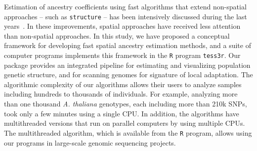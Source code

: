 Estimation of ancestry coefficients using fast algorithms that extend
non-spatial approaches -- such as {\tt structure} -- has been intensively
discussed during the last years~\citep{Wollstein2015}. In these improvements,
spatial approaches have received less attention than non-spatial approaches. In
this study, we have proposed a conceptual framework for developing fast spatial
ancestry estimation methods, and a suite of computer programs implements this
framework in the {\tt R} program {\tt tess3r}. Our package provides an
integrated pipeline for estimating and visualizing population genetic structure,
and for scanning genomes for signature of local adaptation. The algorithmic
complexity of our algorithms allows their users to analyze samples including
hundreds to thousands of individuals. For example, analyzing more than one
thousand {\it A. thaliana} genotypes, each including more than 210k SNPs, took
only a few minutes using a single CPU. In addition, the algorithms have
multithreaded versions that run on parallel computers by using multiple CPUs.
The multithreaded algorithm, which is available from the {\tt R} program, allows
using our programs in large-scale genomic sequencing projects.


